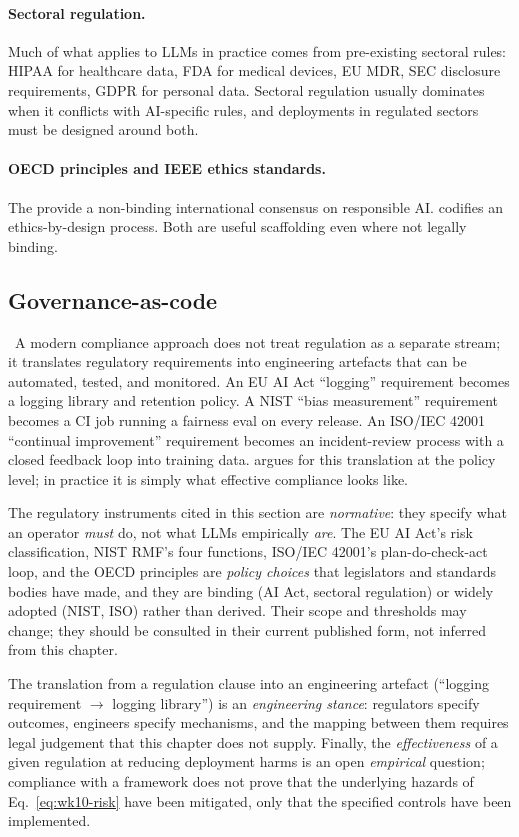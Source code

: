 \paragraph{Sectoral regulation.} Much of what applies to LLMs in
practice comes from pre-existing sectoral rules: HIPAA for
healthcare data, FDA for medical devices, EU MDR, SEC disclosure
requirements, GDPR for personal data. Sectoral regulation
usually dominates when it conflicts with AI-specific rules, and
deployments in regulated sectors must be designed around both.

\paragraph{OECD principles and IEEE ethics standards.} The
\citet{oecd_ai_principles} provide a non-binding international
consensus on responsible AI. \citet{ieee_7000} codifies an
ethics-by-design process. Both are useful scaffolding even where
not legally binding.

\subsection{Governance-as-code}

\Norm\ A modern compliance approach does not treat regulation as
a separate stream; it translates regulatory requirements into
engineering artefacts that can be automated, tested, and
monitored. An EU AI Act ``logging'' requirement becomes a
logging library and retention policy. A NIST ``bias measurement''
requirement becomes a CI job running a fairness eval on every
release. An ISO/IEC 42001 ``continual improvement'' requirement
becomes an incident-review process with a closed feedback loop
into training data. \citet{anderljung2023frontier} argues for
this translation at the policy level; in practice it is simply
what effective compliance looks like.

\begin{provedassumed}
The regulatory instruments cited in this section are
\emph{normative}: they specify what an operator \emph{must} do,
not what LLMs empirically \emph{are}. The EU AI Act's risk
classification, NIST RMF's four functions, ISO/IEC 42001's
plan-do-check-act loop, and the OECD principles are
\emph{policy choices} that legislators and standards bodies have
made, and they are binding (AI Act, sectoral regulation) or
widely adopted (NIST, ISO) rather than derived. Their scope and
thresholds may change; they should be consulted in their current
published form, not inferred from this chapter.

The translation from a regulation clause into an engineering
artefact (``logging requirement $\to$ logging library'')
is an \emph{engineering stance}: regulators specify outcomes,
engineers specify mechanisms, and the mapping between them
requires legal judgement that this chapter does not supply.
Finally, the \emph{effectiveness} of a given regulation at
reducing deployment harms is an open \emph{empirical} question;
compliance with a framework does not prove that the underlying
hazards of Eq.~\eqref{eq:wk10-risk} have been mitigated, only
that the specified controls have been implemented.
\end{provedassumed}

